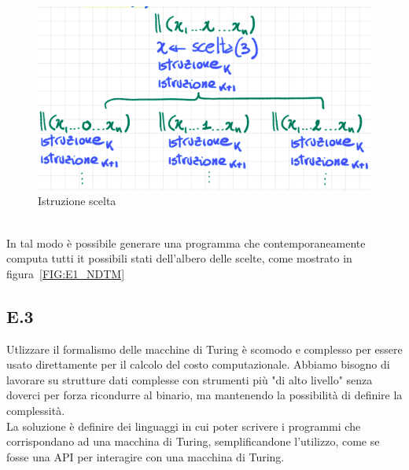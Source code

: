 \documentclass[a4paper]{article}
\begin{document}
\begin{itemize}
\begin{figure}[!ht]
		\centering
		\includegraphics[scale = 0.5]{./img/E2.png}
		\caption{Istruzione scelta} \label{FIG:E2}
		\end{figure}\\
		In tal modo è possibile generare una programma che contemporaneamente computa tutti it possibili stati dell'albero delle scelte, come mostrato in figura~\ref{FIG:E1_NDTM}
		\end{itemize}
\subsection{E.3}
Utlizzare il formalismo delle macchine di Turing è scomodo e complesso per essere usato direttamente per il calcolo del costo computazionale.
Abbiamo bisogno di lavorare su strutture dati complesse con strumenti più "di alto livello" senza doverci per forza ricondurre al binario, ma mantenendo la possibilità di definire la complessità.\\
La soluzione è definire dei linguaggi in cui poter scrivere i programmi che corrispondano ad una macchina di Turing, semplificandone l'utilizzo, come se fosse una API per interagire con una macchina di Turing.
\end{document}
